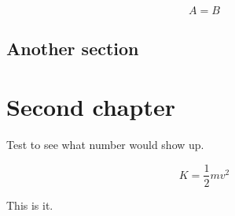 \documentclass[noocg]{wwwnotes2}
\begin{document}
\lipsum[2]

\begin{equation}
	A = B
\end{equation}

\lipsum[3-8]



\section{Another section}

\lipsum[5-9]

\chapter{Second chapter}

Test \theequation to see what number would show up.

\lipsum[10-23]

\begin{equation}
K = \frac12 mv^2
\end{equation}

This is it.



\cleardoublepage
{}
{}


\end{document}
